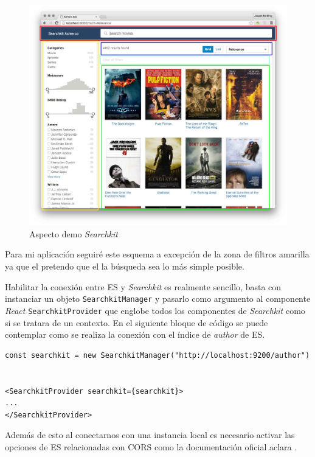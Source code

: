 \begin{figure}[h]
	
	\centering
	\includegraphics[width=\linewidth]{imagenes/AspectDemoSearchKit}
	\caption{Aspecto demo \textit{Searchkit}}
\end{figure}

Para mi aplicación seguiré este esquema a excepción de la zona de filtros amarilla ya que el pretendo que el la búsqueda sea lo más simple posible.

Habilitar la conexión entre \acrshort{ES} y \textit{Searchkit} es realmente sencillo, basta con instanciar un objeto \texttt{SearchkitManager} y pasarlo como argumento al componente \textit{React} \texttt{SearchkitProvider} que englobe todos los componentes de \textit{Searchkit} como si se tratara de un contexto. En el siguiente bloque de código se puede contemplar como se realiza la conexión con el índice de \textit{author} de \acrshort{ES}.

\newpage

\begin{lstlisting}[style=htmlcssjs, caption=Conexión de \textit{Searchkit} a una instancia \acrshort{ES} local]
const searchkit = new SearchkitManager("http://localhost:9200/author")


<SearchkitProvider searchkit={searchkit}>
...
</SearchkitProvider>
\end{lstlisting}

Además de esto al conectarnos con una instancia local es necesario activar las opciones de \acrshort{ES} relacionadas con CORS como la documentación oficial aclara \cite{searchKit_cors}.

